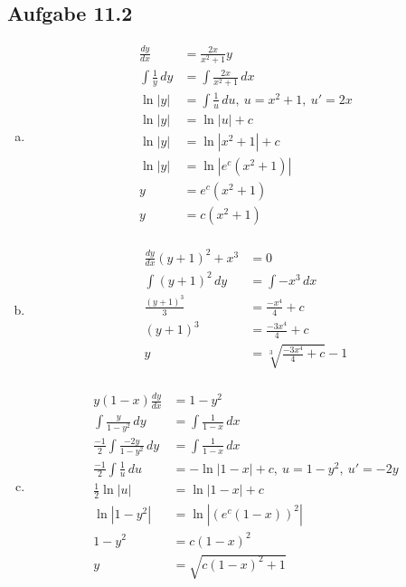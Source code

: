 \documentclass{standalone}
\begin{document}
\subsection{Aufgabe 11.2}
\begin{enumerate}[a)]
\item
    \begin{align*}
        \frac{dy}{dx} &= \frac{2x}{x^2+1}y \\
        \int \frac{1}{y} \,dy &= \int \frac{2x}{x^2+1} \,dx \\
        \ln|y| &= \int \frac{1}{u} \,du,\ u = x^2+1,\ u' = 2x \\
        \ln|y| &= \ln|u| + c \\
        \ln|y| &= \ln|x^2+1| + c \\
        \ln|y| &= \ln|e^c(x^2+1)| \\
        y &= e^c(x^2+1) \\
        y &= c(x^2+1) \\
    \end{align*}

\item
    \begin{align*}
        \frac{dy}{dx} (y + 1)^2 + x^3 &= 0 \\
        \int (y + 1)^2 \,dy &= \int -x^3 \,dx \\
        \frac{(y + 1)^3}{3} &= \frac{-x^4}{4} + c \\
        (y + 1)^3 &= \frac{-3x^4}{4} + c \\
        y &= \sqrt[3]{\frac{-3x^4}{4} + c} - 1 \\
    \end{align*}

\item
    \begin{align*}
        y(1-x) \frac{dy}{dx} &= 1-y^2 \\
        \int \frac{y}{1-y^2} \,dy &= \int \frac{1}{1-x} \,dx \\
        \frac{-1}{2} \int \frac{-2y}{1-y^2} \,dy &= \int \frac{1}{1-x} \,dx \\
        \frac{-1}{2} \int \frac{1}{u} \,du &= -\ln|1-x| + c,\ u = 1-y^2,\ u' = -2y \\
        \frac{1}{2} \ln|u| &= \ln|1-x| + c \\
        \ln|1-y^2| &= \ln|(e^c(1-x))^2| \\
        1-y^2 &= c(1-x)^2 \\
        y &= \sqrt{c(1-x)^2 + 1} \\
    \end{align*}

\end{enumerate}
\end{document}
